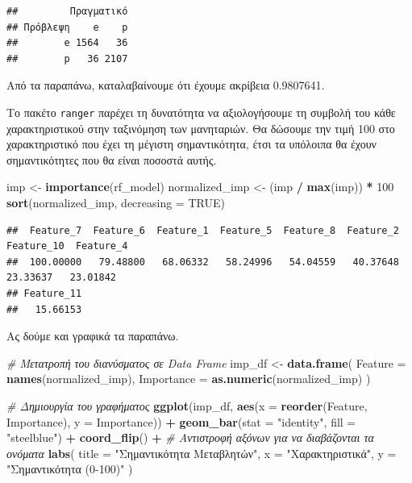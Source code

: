 \documentclass[
]{article}
\newenvironment{Shaded}{\begin{snugshade}}{\end{snugshade}}
\newcommand{\AttributeTok}[1]{\textcolor[rgb]{0.13,0.29,0.53}{#1}}
\newcommand{\CommentTok}[1]{\textcolor[rgb]{0.56,0.35,0.01}{\textit{#1}}}
\newcommand{\ConstantTok}[1]{\textcolor[rgb]{0.56,0.35,0.01}{#1}}
\newcommand{\DecValTok}[1]{\textcolor[rgb]{0.00,0.00,0.81}{#1}}
\newcommand{\FunctionTok}[1]{\textcolor[rgb]{0.13,0.29,0.53}{\textbf{#1}}}
\newcommand{\NormalTok}[1]{#1}
\newcommand{\OtherTok}[1]{\textcolor[rgb]{0.56,0.35,0.01}{#1}}
\newcommand{\SpecialCharTok}[1]{\textcolor[rgb]{0.81,0.36,0.00}{\textbf{#1}}}
\newcommand{\StringTok}[1]{\textcolor[rgb]{0.31,0.60,0.02}{#1}}
\begin{document}
\begin{verbatim}
##         Πραγματικό
## Πρόβλεψη    e    p
##        e 1564   36
##        p   36 2107
\end{verbatim}

Από τα παραπάνω, καταλαβαίνουμε ότι έχουμε ακρίβεια 0.9807641.

Το πακέτο \texttt{ranger} παρέχει τη δυνατότητα να αξιολογήσουμε τη
συμβολή του κάθε χαρακτηριστικού στην ταξινόμηση των μανηταριών. Θα
δώσουμε την τιμή 100 στο χαρακτηριστικό που έχει τη μέγιστη
σημαντικότητα, έτσι τα υπόλοιπα θα έχουν σημαντικότητες που θα είναι
ποσοστά αυτής.

\begin{Shaded}
\begin{Highlighting}[]
\NormalTok{imp }\OtherTok{\textless{}{-}} \FunctionTok{importance}\NormalTok{(rf\_model)}
\NormalTok{normalized\_imp }\OtherTok{\textless{}{-}}\NormalTok{ (imp }\SpecialCharTok{/} \FunctionTok{max}\NormalTok{(imp)) }\SpecialCharTok{*} \DecValTok{100}
\FunctionTok{sort}\NormalTok{(normalized\_imp, }\AttributeTok{decreasing =} \ConstantTok{TRUE}\NormalTok{)}
\end{Highlighting}
\end{Shaded}

\begin{verbatim}
##  Feature_7  Feature_6  Feature_1  Feature_5  Feature_8  Feature_2 Feature_10  Feature_4 
##  100.00000   79.48800   68.06332   58.24996   54.04559   40.37648   23.33637   23.01842 
## Feature_11 
##   15.66153
\end{verbatim}

Ας δούμε και γραφικά τα παραπάνω.

\begin{Shaded}
\begin{Highlighting}[]
\CommentTok{\# Μετατροπή του διανύσματος σε Data Frame}
\NormalTok{imp\_df }\OtherTok{\textless{}{-}} \FunctionTok{data.frame}\NormalTok{(}
  \AttributeTok{Feature =} \FunctionTok{names}\NormalTok{(normalized\_imp),}
  \AttributeTok{Importance =} \FunctionTok{as.numeric}\NormalTok{(normalized\_imp)}
\NormalTok{)}

\CommentTok{\# Δημιουργία του γραφήματος}
\FunctionTok{ggplot}\NormalTok{(imp\_df, }\FunctionTok{aes}\NormalTok{(}\AttributeTok{x =} \FunctionTok{reorder}\NormalTok{(Feature, Importance), }\AttributeTok{y =}\NormalTok{ Importance)) }\SpecialCharTok{+} 
  \FunctionTok{geom\_bar}\NormalTok{(}\AttributeTok{stat =} \StringTok{"identity"}\NormalTok{, }\AttributeTok{fill =} \StringTok{"steelblue"}\NormalTok{) }\SpecialCharTok{+}
  \FunctionTok{coord\_flip}\NormalTok{() }\SpecialCharTok{+}  \CommentTok{\# Αντιστροφή αξόνων για να διαβάζονται τα ονόματα}
  \FunctionTok{labs}\NormalTok{(}
    \AttributeTok{title =} \StringTok{"Σημαντικότητα Μεταβλητών"}\NormalTok{,}
    \AttributeTok{x =} \StringTok{"Χαρακτηριστικά"}\NormalTok{,}
    \AttributeTok{y =} \StringTok{"Σημαντικότητα (0{-}100)"}
\NormalTok{  )}
\end{Highlighting}
\end{Shaded}
\end{document}
